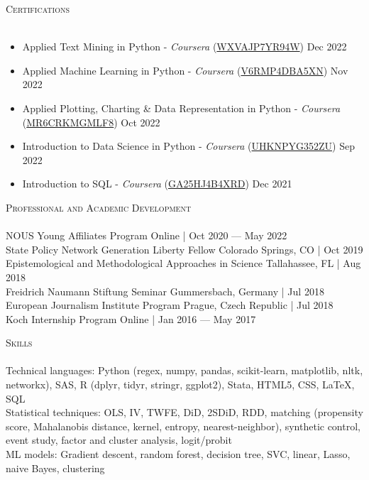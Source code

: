 \documentclass[a4paper,11pt]{article}
\newcommand{\lineunder} {
    \vspace*{-8pt} \\
    \hspace*{-18pt} \hrulefill \\
}
\newcommand{\header} [1] {
    {\hspace*{-18pt}\vspace*{6pt} \textsc{\large{#1}}}
    \vspace*{-6pt} \lineunder
}
\begin{document}
\vspace{1mm}
\header{Certifications}
\begin{itemize}
    \item Applied Text Mining in Python - \emph{Coursera} (\href{https://www.coursera.org/account/accomplishments/verify/WXVAJP7YR94W}{WXVAJP7YR94W}) \hfill Dec 2022
    \item Applied Machine Learning in Python - \emph{Coursera} (\href{https://www.coursera.org/account/accomplishments/certificate/V6RMP4DBA5XN}{V6RMP4DBA5XN}) \hfill Nov 2022
    \item Applied Plotting, Charting \& Data Representation in Python - \emph{Coursera} (\href{https://www.coursera.org/account/accomplishments/certificate/MR6CRKMGMLF8}{MR6CRKMGMLF8}) \hfill Oct 2022
    \item Introduction to Data Science in Python - \emph{Coursera} (\href{https://www.coursera.org/account/accomplishments/certificate/UHKNPYG352ZU}{UHKNPYG352ZU}) \hfill Sep 2022
    \item Introduction to SQL - \emph{Coursera} (\href{https://coursera.org/verify/GA25HJ4B4XRD}{GA25HJ4B4XRD}) \hfill Dec 2021
\end{itemize}
\vspace{1mm}
\header{Professional and Academic Development}

NOUS Young Affiliates Program \hfill Online | Oct 2020 --- May 2022 \\

State Policy Network Generation Liberty Fellow \hfill Colorado Springs, CO | Oct 2019 \\

Epistemological and Methodological Approaches in Science \hfill Tallahassee, FL | Aug 2018\\

Freidrich Naumann Stiftung Seminar \hfill Gummersbach, Germany | Jul 2018 \\

European Journalism Institute Program \hfill Prague, Czech Republic | Jul 2018 \\

Koch Internship Program \hfill Online | Jan 2016 --- May 2017

\vspace{1mm}
\header{Skills}
Technical languages: Python (regex, numpy, pandas, scikit-learn, matplotlib, nltk, networkx), SAS, R (dplyr, tidyr, stringr, ggplot2), Stata, HTML5, CSS, \LaTeX, SQL \\

Statistical techniques: OLS, IV, TWFE, DiD, 2SDiD, RDD, matching (propensity score, Mahalanobis distance, kernel, entropy, nearest-neighbor), synthetic control, event study, factor and cluster analysis, logit/probit \\

ML models: Gradient descent, random forest, decision tree, SVC, linear, Lasso, naive Bayes, clustering
\end{document}
